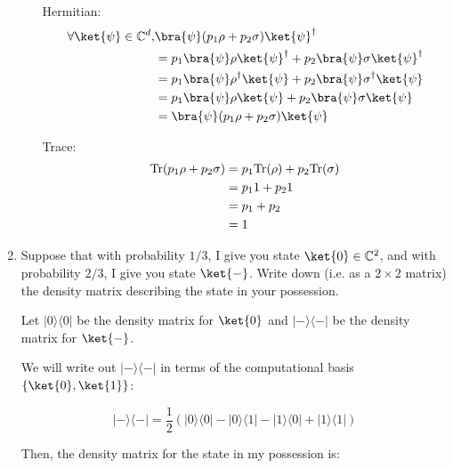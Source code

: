 \documentclass{article}
\newcommand{\ketbra}[2]{|#1\rangle\!\langle #2|}
\newcommand{\trace}{{\rm Tr}}
\newcommand{\complex}{{\mathbb C}}
\begin{document}
\begin{enumerate}
\begin{enumerate}
                Hermitian:
                $$\begin{aligned}\forall \ket{\psi}\in\complex^d,
                     & \bra{\psi}(p_1\rho+p_2\sigma)\ket{\psi}^\dagger                            \\
                     & =p_1\bra{\psi}\rho\ket{\psi}^\dagger+p_2\bra{\psi}\sigma\ket{\psi}^\dagger \\
                     & =p_1\bra{\psi}\rho^\dagger\ket{\psi}+p_2\bra{\psi}\sigma^\dagger\ket{\psi} \\
                     & =p_1\bra{\psi}\rho\ket{\psi}+p_2\bra{\psi}\sigma\ket{\psi}                 \\
                     & =\bra{\psi}(p_1\rho+p_2\sigma)\ket{\psi}                                   \\
                  \end{aligned}
                $$

                Trace:
                $$\begin{aligned}
                    \trace(p_1\rho+p_2\sigma) & =p_1\trace(\rho)+p_2\trace(\sigma) \\
                                              & =p_11+p_21                         \\
                                              & =p_1+p_2                           \\
                                              & =1
                  \end{aligned}$$
        \end{enumerate}
  \item
        Suppose that with probability $1/3$, I give you state $\ket{0}\in\complex^2$, and with probability $2/3$, I give you state $\ket{-}$. Write down (i.e. as a $2\times 2$ matrix) the density matrix describing the state in your possession.

        Let $\ketbra{0}{0}$ be the density matrix for $\ket{0}$ and $\ketbra{-}{-}$ be the density matrix for $\ket{-}$.

        We will write out $\ketbra{-}{-}$ in terms of the computational basis $\{\ket{0},\ket{1}\}$:

        $$\ketbra{-}{-}=\frac{1}{2}\left(\ketbra{0}{0}-\ketbra{0}{1}-\ketbra{1}{0}+\ketbra{1}{1}\right)$$

        Then, the density matrix for the state in my possession is:


\end{enumerate}
\end{document}
